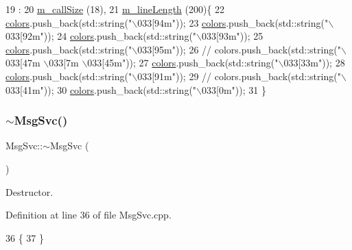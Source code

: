 \begin{DoxyCode}
19                  : 
20   \hyperlink{classMsgSvc_ab22aa5d8130cbb94246c4192440d41fb}{m\_callSize}   (18),
21   \hyperlink{classMsgSvc_a63c500a8e8573e6e68e0c2966920ddaa}{m\_lineLength} (200)\{
22   \hyperlink{classMsgSvc_abcd0a0eab83f97f7638bbcca4f69e950}{colors}.push\_back(std::string(\textcolor{stringliteral}{"\(\backslash\)033[94m"}));
23   \hyperlink{classMsgSvc_abcd0a0eab83f97f7638bbcca4f69e950}{colors}.push\_back(std::string(\textcolor{stringliteral}{"\(\backslash\)033[92m"}));
24   \hyperlink{classMsgSvc_abcd0a0eab83f97f7638bbcca4f69e950}{colors}.push\_back(std::string(\textcolor{stringliteral}{"\(\backslash\)033[93m"}));
25   \hyperlink{classMsgSvc_abcd0a0eab83f97f7638bbcca4f69e950}{colors}.push\_back(std::string(\textcolor{stringliteral}{"\(\backslash\)033[95m"}));
26 \textcolor{comment}{//  colors.push\_back(std::string("\(\backslash\)033[47m \(\backslash\)033[7m \(\backslash\)033[45m"));}
27   \hyperlink{classMsgSvc_abcd0a0eab83f97f7638bbcca4f69e950}{colors}.push\_back(std::string(\textcolor{stringliteral}{"\(\backslash\)033[33m"}));
28   \hyperlink{classMsgSvc_abcd0a0eab83f97f7638bbcca4f69e950}{colors}.push\_back(std::string(\textcolor{stringliteral}{"\(\backslash\)033[91m"}));
29 \textcolor{comment}{//  colors.push\_back(std::string("\(\backslash\)033[41m"));}
30   \hyperlink{classMsgSvc_abcd0a0eab83f97f7638bbcca4f69e950}{colors}.push\_back(std::string(\textcolor{stringliteral}{"\(\backslash\)033[0m"}));
31 \}
\end{DoxyCode}
\mbox{\label{classMsgSvc_a07f15da0052e8703a89b2fc66382fe0e}} 
\subsubsection{\texorpdfstring{$\sim$\+Msg\+Svc()}{~MsgSvc()}}
{\footnotesize\ttfamily Msg\+Svc\+::$\sim$\+Msg\+Svc (\begin{DoxyParamCaption}{ }\end{DoxyParamCaption})\hspace{0.3cm}{\ttfamily [virtual]}}



Destructor. 



Definition at line 36 of file Msg\+Svc.\+cpp.


\begin{DoxyCode}
36                 \{
37 \} 
\end{DoxyCode}



